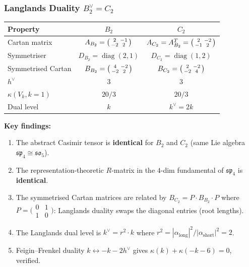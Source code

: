 \subsubsection*{Langlands Duality $B_2^\vee = C_2$}

\begin{center}
\begin{tabular}{lcc}
\toprule
Property & $B_2$ & $C_2$ \\
\midrule
Cartan matrix & $A_{B_2} = \begin{psmallmatrix} 2 & -1 \\ -2 & 2 \end{psmallmatrix}$
 & $A_{C_2} = A_{B_2}^T = \begin{psmallmatrix} 2 & -2 \\ -1 & 2 \end{psmallmatrix}$ \\[4pt]
Symmetriser & $D_{B_2} = \operatorname{diag}(2,1)$
 & $D_{C_2} = \operatorname{diag}(1,2)$ \\[2pt]
Symmetrised Cartan & $B_{B_2} = \begin{psmallmatrix} 4 & -2 \\ -2 & 2 \end{psmallmatrix}$
 & $B_{C_2} = \begin{psmallmatrix} 2 & -2 \\ -2 & 4 \end{psmallmatrix}$ \\[4pt]
$h^\vee$ & $3$ & $3$ \\
$\kappa(V_k, k{=}1)$ & $20/3$ & $20/3$ \\
Dual level & $k$ & $k^\vee = 2k$ \\
\bottomrule
\end{tabular}
\end{center}

\noindent\textbf{Key findings:}
\begin{enumerate}
\item The abstract Casimir tensor is \textbf{identical} for $B_2$ and $C_2$
 (same Lie algebra $\mathfrak{sp}_4 \cong \mathfrak{so}_5$).
\item The representation-theoretic $R$-matrix in the $4$-dim fundamental
 of $\mathfrak{sp}_4$ is \textbf{identical}.
\item The symmetrised Cartan matrices are related by
 $B_{C_2} = P \cdot B_{B_2} \cdot P$ where $P = \bigl(\begin{smallmatrix} 0 & 1 \\ 1 & 0 \end{smallmatrix}\bigr)$:
 Langlands duality swaps the diagonal entries (root lengths).
\item The Langlands dual level is $k^\vee = r^2 \cdot k$ where
 $r^2 = |\alpha_{\mathrm{long}}|^2 / |\alpha_{\mathrm{short}}|^2 = 2$.

\item Feigin--Frenkel duality $k \leftrightarrow -k - 2h^\vee$ gives
 $\kappa(k) + \kappa(-k-6) = 0$, verified.
\end{enumerate}

